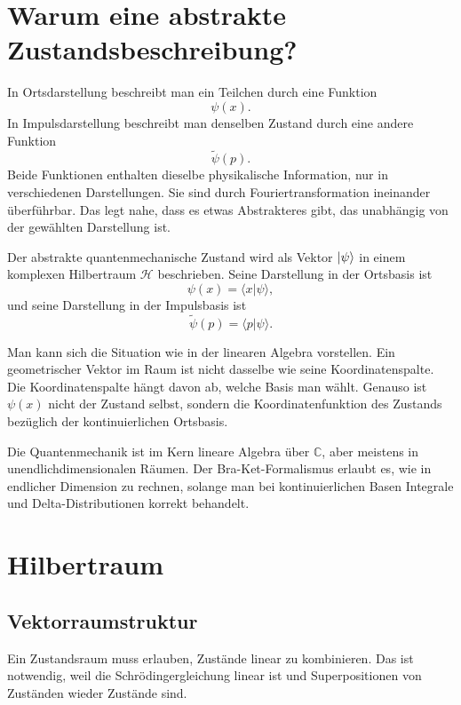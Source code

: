 \section{Warum eine abstrakte Zustandsbeschreibung?}

In Ortsdarstellung beschreibt man ein Teilchen durch eine Funktion
\[
    \psi(x).
\]
In Impulsdarstellung beschreibt man denselben Zustand durch eine andere Funktion
\[
    \tilde\psi(p).
\]
Beide Funktionen enthalten dieselbe physikalische Information, nur in verschiedenen Darstellungen. Sie sind durch Fouriertransformation ineinander überführbar. Das legt nahe, dass es etwas Abstrakteres gibt, das unabhängig von der gewählten Darstellung ist.

\begin{definitionbox}
Der abstrakte quantenmechanische Zustand wird als Vektor $\left|\psi\right\rangle$ in einem komplexen Hilbertraum $\mathcal H$ beschrieben. Seine Darstellung in der Ortsbasis ist
\[
    \psi(x)=\langle x|\psi\rangle,
\]
und seine Darstellung in der Impulsbasis ist
\[
    \tilde\psi(p)=\langle p|\psi\rangle.
\]
\end{definitionbox}

Man kann sich die Situation wie in der linearen Algebra vorstellen. Ein geometrischer Vektor im Raum ist nicht dasselbe wie seine Koordinatenspalte. Die Koordinatenspalte hängt davon ab, welche Basis man wählt. Genauso ist $\psi(x)$ nicht der Zustand selbst, sondern die Koordinatenfunktion des Zustands bezüglich der kontinuierlichen Ortsbasis.

\begin{notebox}
Die Quantenmechanik ist im Kern lineare Algebra über $\mathbb C$, aber meistens in unendlichdimensionalen Räumen. Der Bra-Ket-Formalismus erlaubt es, wie in endlicher Dimension zu rechnen, solange man bei kontinuierlichen Basen Integrale und Delta-Distributionen korrekt behandelt.
\end{notebox}

\section{Hilbertraum}

\subsection{Vektorraumstruktur}

Ein Zustandsraum muss erlauben, Zustände linear zu kombinieren. Das ist notwendig, weil die Schrödingergleichung linear ist und Superpositionen von Zuständen wieder Zustände sind.

